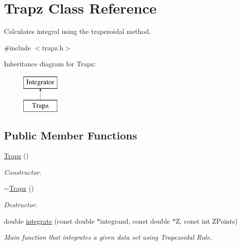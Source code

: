 \hypertarget{classTrapz}{
\section{Trapz Class Reference}
\label{d8/da8/classTrapz}
}


Calculates integral using the trapezoidal method.  




{\ttfamily \#include $<$trapz.h$>$}

Inheritance diagram for Trapz:\begin{figure}[H]
\begin{center}
\leavevmode
\includegraphics[height=2cm]{d8/da8/classTrapz}
\end{center}
\end{figure}
\subsection*{Public Member Functions}
\begin{DoxyCompactItemize}
\item 
\hypertarget{classTrapz_a464cc7e5b33620d799cb89f69f70f1b4}{
\hyperlink{classTrapz_a464cc7e5b33620d799cb89f69f70f1b4}{Trapz} ()}
\label{d8/da8/classTrapz_a464cc7e5b33620d799cb89f69f70f1b4}

\begin{DoxyCompactList}\small\item\em Constructor. \item\end{DoxyCompactList}\item 
\hypertarget{classTrapz_adff2586590ecb48620b749a0966f32a7}{
\hyperlink{classTrapz_adff2586590ecb48620b749a0966f32a7}{$\sim$Trapz} ()}
\label{d8/da8/classTrapz_adff2586590ecb48620b749a0966f32a7}

\begin{DoxyCompactList}\small\item\em Destructor. \item\end{DoxyCompactList}\item 
double \hyperlink{classTrapz_a8aee327ed631f75ef3dea7e458f71cca}{integrate} (const double $\ast$integrand, const double $\ast$Z, const int ZPoints)
\begin{DoxyCompactList}\small\item\em Main function that integrates a given data set using Trapezoidal Rule. \item\end{DoxyCompactList}\end{DoxyCompactItemize}



